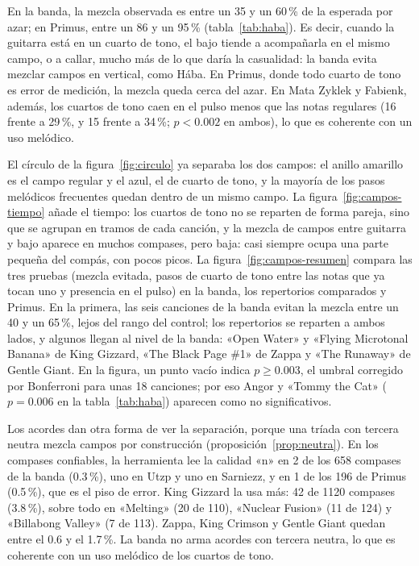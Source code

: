 En la banda, la mezcla observada es entre un 35 y un 60\,\% de la esperada por azar; en Primus, entre un 86 y un 95\,\%
(tabla~\ref{tab:haba}). Es decir, cuando la guitarra está en un cuarto de tono, el bajo tiende a acompañarla en el mismo
campo, o a callar, mucho más de lo que daría la casualidad: la banda evita mezclar campos en vertical, como Hába. En
Primus, donde todo cuarto de tono es error de medición, la mezcla queda cerca del azar. En Mata Zyklek y Fabienk, además,
los cuartos de tono caen en el pulso menos que las notas regulares (16 frente a 29\,\%, y 15 frente a 34\,\%; $p < 0.002$
en ambos), lo que es coherente con un uso melódico.

El círculo de la figura~\ref{fig:circulo} ya separaba los dos campos: el anillo amarillo es el campo regular y el azul,
el de cuarto de tono, y la mayoría de los pasos melódicos frecuentes quedan dentro de un mismo campo. La
figura~\ref{fig:campos-tiempo} añade el tiempo: los cuartos de tono no se reparten de forma pareja, sino que se agrupan en
tramos de cada canción, y la mezcla de campos entre guitarra y bajo aparece en muchos compases, pero baja: casi siempre ocupa una parte
pequeña del compás, con pocos picos. La
figura~\ref{fig:campos-resumen} compara las tres pruebas (mezcla evitada, pasos de cuarto de tono entre las notas que ya
tocan uno y presencia en el pulso) en la banda, los repertorios comparados y Primus. En la primera, las seis canciones de
la banda evitan la mezcla entre un 40 y un 65\,\%, lejos del rango del control; los repertorios se reparten a ambos lados,
y algunos llegan al nivel de la banda: «Open Water» y «Flying Microtonal Banana» de King Gizzard, «The Black Page \#1»
de Zappa y «The Runaway» de Gentle Giant. En la figura, un punto vacío indica $p \geq 0.003$, el umbral corregido por
Bonferroni para unas 18 canciones; por eso Angor y «Tommy the Cat» ($p = 0.006$ en la tabla~\ref{tab:haba}) aparecen
como no significativos.

Los acordes dan otra forma de ver la separación, porque una tríada con tercera neutra mezcla campos por construcción
(proposición~\ref{prop:neutra}). En los compases confiables, la herramienta lee la calidad «n» en 2 de los 658 compases de
la banda (0.3\,\%), uno en Utzp y uno en Sarniezz, y en 1 de los 196 de Primus (0.5\,\%), que es el piso de error. King
Gizzard la usa más: 42 de 1120 compases (3.8\,\%), sobre todo en «Melting» (20 de 110), «Nuclear Fusion» (11 de 124) y
«Billabong Valley» (7 de 113). Zappa, King Crimson y Gentle Giant quedan entre el 0.6 y el 1.7\,\%. La banda no arma
acordes con tercera neutra, lo que es coherente con un uso melódico de los cuartos de tono.


